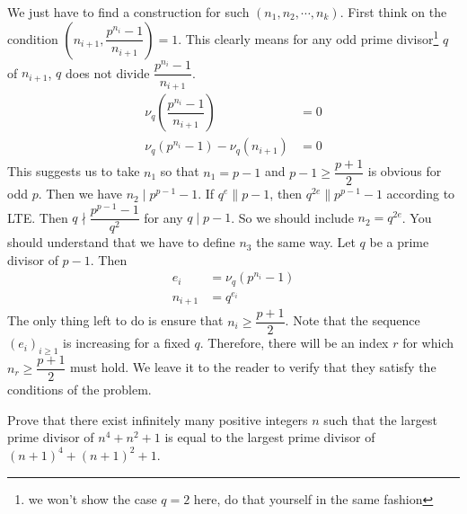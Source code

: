 \documentclass[problems.tex]{subfile}
\begin{document}
\begin{solution}
		We just have to find a construction for such $(n_1,n_2,\cdots,n_k)$. First think on the condition $\left(n_{i+1},\dfrac{p^{n_i}-1}{n_{i+1}}\right)=1$. This clearly means for any odd prime divisor\footnote{we won't show the case $q=2$ here, do that yourself in the same fashion} $q$ of $n_{i+1}$, $q$ does not divide $\dfrac{p^{n_i}-1}{n_{i+1}}$.
			\begin{align*}
				\nu_q\left(\dfrac{p^{n_i}-1}{n_{i+1}}\right) & = 0\\
				\nu_q(p^{n_i}-1)-\nu_q(n_{i+1}) & = 0
			\end{align*}
		This suggests us to take $n_1$ so that $n_1=p-1$ and $p-1\geq\dfrac{p+1}{2}$ is obvious for odd $p$. Then we have $n_2\mid p^{p-1}-1$. If $q^e\|p-1$, then $q^{2e}\|p^{p-1}-1$ according to LTE. Then $q\nmid\dfrac{p^{p-1}-1}{q^2}$ for any $q\mid p-1$. So we should include $n_2=q^{2e}$. You should understand that we have to define $n_3$ the same way. Let $q$ be a prime divisor of $p-1$. Then
			\begin{align*}
				e_i & = \nu_q\left(p^{n_i}-1\right)\\
				n_{i+1} & = q^{e_i}
			\end{align*}
		The only thing left to do is ensure that $n_i\geq\dfrac{p+1}{2}$. Note that the sequence $(e_i)_{i\geq1}$ is increasing for a fixed $q$. Therefore, there will be an index $r$ for which $n_r\geq\dfrac{p+1}{2}$ must hold. We leave it to the reader to verify that they satisfy the conditions of the problem.
	\end{solution}

	\begin{problem}
		Prove that there exist infinitely many positive integers $n$ such that the largest prime divisor of $n^4+n^2+1$ is equal to the largest prime divisor of $(n+1)^4+(n+1)^2+1$.
	\end{problem}
\end{document}
